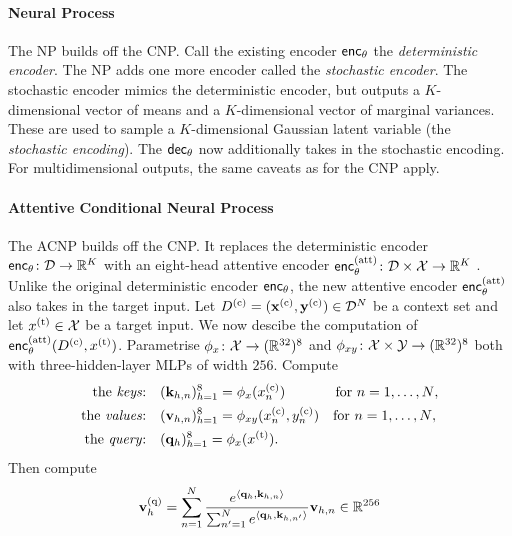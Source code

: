 \documentclass[12pt]{report}
\begin{document}
\paragraph{Neural Process \parencite[NP;][]{Garnelo:2018:Neural_Processes}}
The NP builds off the CNP.
Call the existing encoder $\mathsf{enc}_\theta$ the \emph{deterministic encoder}.
The NP adds one more encoder called the \emph{stochastic encoder}.
The stochastic encoder mimics the deterministic encoder, but outputs a $K$-dimensional vector of means and a $K$-dimensional vector of marginal variances.
These are used to sample a $K$-dimensional Gaussian latent variable (the \emph{stochastic encoding}).
The $\mathsf{dec}_\theta$ now additionally takes in the stochastic encoding.
For multidimensional outputs, the same caveats as for the CNP apply.


\paragraph{Attentive Conditional Neural Process \parencite[ACNP;][]{Kim:2019:Attentive_Neural_Processes}}
The ACNP builds off the CNP.
It replaces the deterministic encoder $\mathsf{enc}_\theta \colon \mathcal{D} \to \mathbb{R}^K$ with an 
eight-head attentive encoder $\enc_\theta\us{(att)}\colon \D \times \X \to \R^K$
\parencite{Bahdanau:2015:Neural_Machine_Translation_by_Jointly,Vaswani:2017:Attention_Is_All_You_Need}.
Unlike the original deterministic encoder $\mathsf{enc}_\theta$, the new attentive encoder $\enc_\theta\us{(att)}$ also takes in the target input.
Let $D\us{(c)} = (\vx\us{(c)}, \vy\us{(c)}) \in \D^N$ be a context set and let $x\us{(t)} \in \X$ be a target input.
We now descibe the computation of $\enc_\theta\us{(att)}(D\us{(c)}, x\us{(t)})$.
Parametrise $\phi_x\colon \mathcal{X} \to (\mathbb{R}^{32})^8$ and $\phi_{xy}\colon \mathcal{X} \times \mathcal{Y} \to (\mathbb{R}^{32})^8$ both with three-hidden-layer MLPs of width $256$.
Compute
\begin{align}
    \text{the \emph{keys}:} & \quad (\vk_{h,n})_{h=1}^8 = \phi_{x}(x\us{(c)}_n) \quad\hspace{26pt} \text{for $n = 1, \ldots, N$}, \\
    \text{the \emph{values}:} & \quad (\vv_{h,n})_{h=1}^8 = \phi_{xy}(x\us{(c)}_n, y\us{(c)}_n) \quad \text{for $n = 1, \ldots, N$}, \\
    \text{the \emph{query}:} & \quad (\vq_h)_{h=1}^8 = \phi_{x}(x\us{(t)}).
\end{align}
Then compute
\begin{equation}
    \vv\us{(q)}_h = \sum_{n=1}^N  \frac{e^{\lra{\vq_h, \vk_{h, n}}}}{\sum_{n'=1}^Ne^{\lra{\vq_h, \vk_{h, n'}}}} \vv_{h,n} \in \R^{256}
\end{equation}
\end{document}
